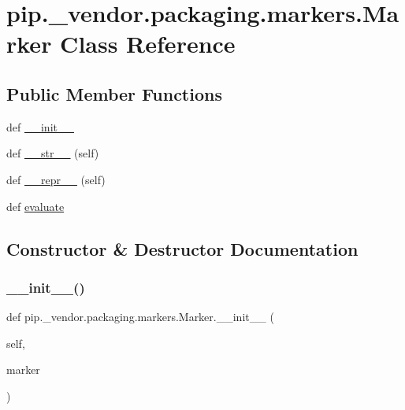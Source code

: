 \hypertarget{classpip_1_1__vendor_1_1packaging_1_1markers_1_1Marker}{}\section{pip.\+\_\+vendor.\+packaging.\+markers.\+Marker Class Reference}
\label{classpip_1_1__vendor_1_1packaging_1_1markers_1_1Marker}
\subsection*{Public Member Functions}
\begin{DoxyCompactItemize}
\item 
def \hyperlink{classpip_1_1__vendor_1_1packaging_1_1markers_1_1Marker_a78b66f35767ba2d18649fb4f1bb70396}{\+\_\+\+\_\+init\+\_\+\+\_\+}
\item 
def \hyperlink{classpip_1_1__vendor_1_1packaging_1_1markers_1_1Marker_a2364f9d4bf5479ad63d06eb9c40192b4}{\+\_\+\+\_\+str\+\_\+\+\_\+} (self)
\item 
def \hyperlink{classpip_1_1__vendor_1_1packaging_1_1markers_1_1Marker_a5dbaf883b42b547b816a2bac429262a4}{\+\_\+\+\_\+repr\+\_\+\+\_\+} (self)
\item 
def \hyperlink{classpip_1_1__vendor_1_1packaging_1_1markers_1_1Marker_a3f7f374abc05daac1cf31913ee63358d}{evaluate}
\end{DoxyCompactItemize}


\subsection{Constructor \& Destructor Documentation}
\mbox{\label{classpip_1_1__vendor_1_1packaging_1_1markers_1_1Marker_a78b66f35767ba2d18649fb4f1bb70396}} 
\subsubsection{\texorpdfstring{\+\_\+\+\_\+init\+\_\+\+\_\+()}{\_\_init\_\_()}}
{\footnotesize\ttfamily def pip.\+\_\+vendor.\+packaging.\+markers.\+Marker.\+\_\+\+\_\+init\+\_\+\+\_\+ (\begin{DoxyParamCaption}\item[{}]{self,  }\item[{}]{marker }\end{DoxyParamCaption})}



